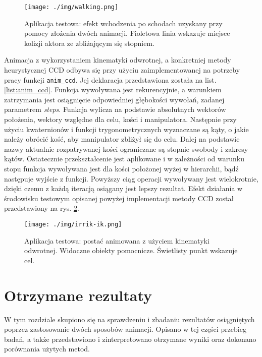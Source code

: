 \documentclass[11pt]{mwrep}
\begin{document}
  \begin{figure}
  \centering
    \texttt{[image: ./img/walking.png]}
  \caption{Aplikacja testowa: efekt wchodzenia po schodach uzyskany przy pomocy złożenia dwóch animacji. Fioletowa linia wskazuje miejsce kolizji aktora ze zbliżającym się stopniem.}
  \label{img:irrikwalking}
  \end{figure}

Animacja z wykorzystaniem kinematyki odwrotnej, a konkretniej metody heurystycznej CCD odbywa się przy użyciu zaimplementowanej na potrzeby pracy funkcji \texttt{anim\_ccd}. Jej deklaracja przedstawiona została na list. \ref{list:anim_ccd}. Funkcja wywoływana jest rekurencyjnie, a warunkiem zatrzymania jest osiągnięcie odpowiedniej głębokości wywołań, zadanej parametrem \textit{steps}. Funkcja wylicza na podstawie absolutnych wektorów położenia, wektory względne dla celu, kości i manipulatora. Następnie przy użyciu kwaternionów i funkcji trygonometrycznych wyznaczane są kąty, o jakie należy obrócić kość, aby manipulator zbliżył się do celu. Dalej na podstawie nazwy aktualnie rozpatrywanej kości ograniczane są stopnie swobody i zakresy kątów. Ostatecznie przekształcenie jest aplikowane i w zależności od warunku stopu funkcja wywoływana jest dla kości położonej wyżej w hierarchii, bądź następuje wyjście z funkcji. Powyższy ciąg operacji wywoływany jest wielokrotnie, dzięki czemu z każdą iteracją osiągany jest lepszy rezultat. Efekt działania w środowisku testowym opisanej powyżej implementacji metody CCD został przedstawiony na rys. \ref{img:irrikccd}.


  \begin{figure}
  \centering
    \texttt{[image: ./img/irrik-ik.png]}
  \caption{Aplikacja testowa: postać animowana z użyciem kinematyki odwrotnej. Widoczne obiekty pomocnicze. Świetlisty punkt wskazuje cel.}
  \label{img:irrikccd}
  \end{figure}

\chapter{Otrzymane rezultaty}

W tym rozdziale skupiono się na sprawdzeniu i zbadaniu rezultatów osiągniętych poprzez zastosowanie dwóch sposobów animacji. Opisano w tej części przebieg badań, a także przedstawiono i zinterpretowano otrzymane wyniki oraz dokonano porównania użytych metod.
\end{document}
